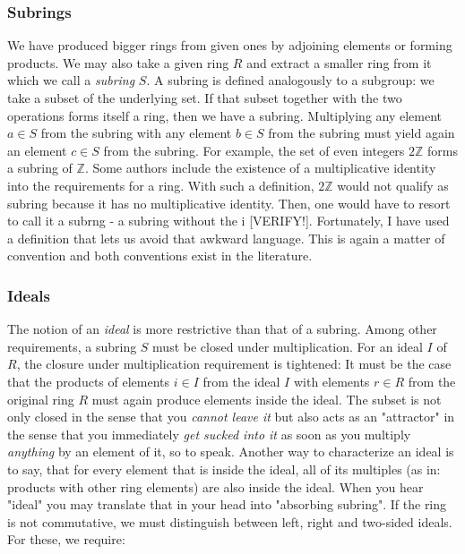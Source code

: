 \subsubsection{Subrings}
We have produced bigger rings from given ones by adjoining elements or forming products. We may also take a given ring $R$ and extract a smaller ring from it which we call a \emph{subring} $S$. A subring is defined analogously to a subgroup: we take a subset of the underlying set. If that subset together with the two operations forms itself a ring, then we have a subring. Multiplying any element $a \in S$ from the subring with any element $b \in S$ from the subring must yield again an element $c \in S$ from the subring. For example, the set of even integers $2 \mathbb{Z}$ forms a subring of $\mathbb{Z}$. Some authors include the existence of a multiplicative identity into the requirements for a ring. With such a definition, $2 \mathbb{Z}$ would not qualify as subring because it has no multiplicative identity. Then, one would have to resort to call it a subrng - a subring without the i [VERIFY!]. Fortunately, I have used a definition that lets us avoid that awkward language. This is again a matter of convention and both conventions exist in the literature.


\subsubsection{Ideals}
The notion of an \emph{ideal} is more restrictive than that of a subring. Among other requirements, a subring $S$ must be closed under multiplication. For an ideal $I$ of $R$, the closure under multiplication requirement is tightened: It must be the case that the products of elements $i \in I$ from the ideal $I$ with elements $r \in R$ from the original ring $R$ must again produce elements inside the ideal. The subset is not only closed in the sense that you \emph{cannot leave it} but also acts as an "attractor" in the sense that you immediately \emph{get sucked into it} as soon as you multiply \emph{anything} by an element of it, so to speak. Another way to characterize an ideal is to say, that for every element that is inside the ideal, all of its multiples (as in: products with other ring elements) are also inside the ideal. When you hear "ideal" you may translate that in your head into "absorbing subring". If the ring is not commutative, we must distinguish between left, right and two-sided ideals. For these, we require:

